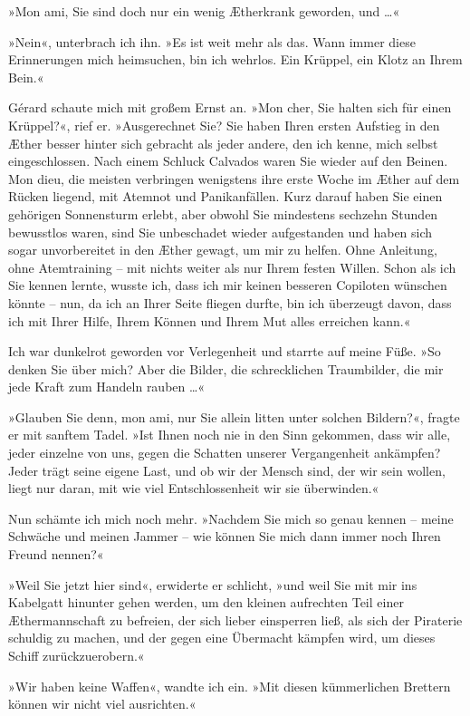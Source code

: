 »Mon ami, Sie sind doch nur ein wenig Ætherkrank geworden, und
\ldots{}«

»Nein«, unterbrach ich ihn. »Es ist weit mehr als das. Wann immer
diese Erinnerungen mich heimsuchen, bin ich wehrlos. Ein Krüppel,
ein Klotz an Ihrem Bein.«

Gérard schaute mich mit großem Ernst an. »Mon cher, Sie halten sich
für einen Krüppel?«, rief er. »Ausgerechnet Sie? Sie haben Ihren
ersten Aufstieg in den Æther besser hinter sich gebracht als jeder
andere, den ich kenne, mich selbst eingeschlossen. Nach einem
Schluck Calvados waren Sie wieder auf den Beinen. Mon dieu, die
meisten verbringen wenigstens ihre erste Woche im Æther auf dem
Rücken liegend, mit Atemnot und Panikanfällen. Kurz darauf haben
Sie einen gehörigen Sonnensturm erlebt, aber obwohl Sie mindestens
sechzehn Stunden bewusstlos waren, sind Sie unbeschadet wieder
aufgestanden und haben sich sogar unvorbereitet in den Æther
gewagt, um mir zu helfen. Ohne Anleitung, ohne Atemtraining – mit
nichts weiter als nur Ihrem festen Willen. Schon als ich Sie kennen
lernte, wusste ich, dass ich mir keinen besseren Copiloten wünschen
könnte – nun, da ich an Ihrer Seite fliegen durfte, bin ich
überzeugt davon, dass ich mit Ihrer Hilfe, Ihrem Können und Ihrem
Mut alles erreichen kann.«

Ich war dunkelrot geworden vor Verlegenheit und starrte auf meine
Füße. »So denken Sie über mich? Aber die Bilder, die schrecklichen
Traumbilder, die mir jede Kraft zum Handeln rauben \ldots{}«

»Glauben Sie denn, mon ami, nur Sie allein litten unter solchen
Bildern?«, fragte er mit sanftem Tadel. »Ist Ihnen noch nie in den
Sinn gekommen, dass wir alle, jeder einzelne von uns, gegen die
Schatten unserer Vergangenheit ankämpfen? Jeder trägt seine eigene
Last, und ob wir der Mensch sind, der wir sein wollen, liegt nur
daran, mit wie viel Entschlossenheit wir sie überwinden.«

Nun schämte ich mich noch mehr. »Nachdem Sie mich so genau kennen –
meine Schwäche und meinen Jammer – wie können Sie mich dann immer
noch Ihren Freund nennen?«

»Weil Sie jetzt hier sind«, erwiderte er schlicht, »und weil Sie
mit mir ins Kabelgatt hinunter gehen werden, um den kleinen
aufrechten Teil einer Æthermannschaft zu befreien, der sich lieber
einsperren ließ, als sich der Piraterie schuldig zu machen, und der
gegen eine Übermacht kämpfen wird, um dieses Schiff
zurückzuerobern.«

»Wir haben keine Waffen«, wandte ich ein. »Mit diesen kümmerlichen
Brettern können wir nicht viel ausrichten.«

